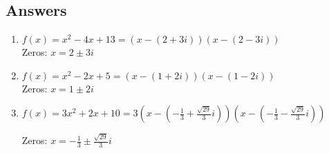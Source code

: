 \newpage

\subsection{Answers}



\begin{enumerate}
\setcounter{enumi}{\value{HW}}

\item $f(x) = x^2-4x+13 = (x-(2+3i)) (x-(2-3i))$ \\
Zeros: $x = 2 \pm 3i$ 

\item $f(x) = x^2 - 2x + 5 = (x-(1+2i))(x-(1-2i))$ \\ 
Zeros:  $x = 1 \pm 2i$


\item $f(x) = 3x^2 + 2x +10 = 3\left(x-\left(-\frac{1}{3} + \frac{\sqrt{29}}{3} i\right) \right) \left(x-\left(-\frac{1}{3} - \frac{\sqrt{29}}{3} i\right) \right)$


Zeros:  $x = -\frac{1}{3} \pm \frac{\sqrt{29}}{3} i$

\setcounter{HW}{\value{enumi}}
\end{enumerate}



